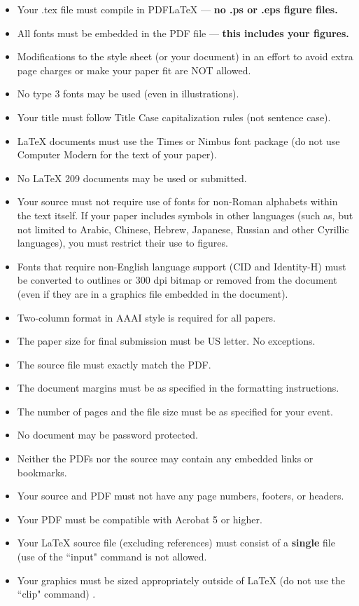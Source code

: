 \documentclass[letterpaper]{article}
\begin{document}
\begin{itemize}
\item Your .tex file must compile in PDF\LaTeX{} --- \textbf{ no .ps or .eps figure files.}
\item All fonts must be embedded in the PDF file --- \textbf{ this includes your figures.}
\item Modifications to the style sheet (or your document) in an effort to avoid extra page charges or make your paper fit are NOT allowed.
\item No type 3 fonts may be used (even in illustrations).
\item Your title must follow Title Case capitalization rules (not sentence case).
\item \LaTeX{} documents must use the Times or Nimbus font package (do not use Computer Modern for the text of your paper).
\item No \LaTeX{} 209 documents may be used or submitted.
\item Your source must not require use of fonts for non-Roman alphabets within the text itself. If your paper includes symbols in other languages (such as, but not limited to Arabic, Chinese, Hebrew, Japanese, Russian and other Cyrillic languages), you must restrict their use to figures.
\item Fonts that require non-English language support (CID and Identity-H) must be converted to outlines or 300 dpi bitmap or removed from the document (even if they are in a graphics file embedded in the document). 
\item Two-column format in AAAI style is required for all papers.
\item The paper size for final submission must be US letter. No exceptions.
\item The source file must exactly match the PDF.
\item The document margins must be as specified in the formatting instructions.
\item The number of pages and the file size must be as specified for your event.
\item No document may be password protected.
\item Neither the PDFs nor the source may contain any embedded links or bookmarks.
\item Your source and PDF must not have any page numbers, footers, or headers.
\item Your PDF must be compatible with Acrobat 5 or higher.
\item Your \LaTeX{} source file (excluding references) must consist of a \textbf{single} file (use of the ``input" command is not allowed.
\item Your graphics must be sized appropriately outside of \LaTeX{} (do not use the ``clip" command) .
\end{itemize}
\end{document}

